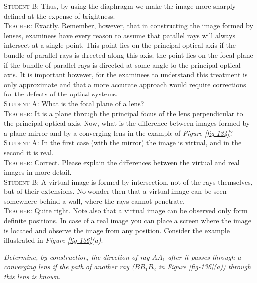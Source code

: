 \documentclass[a4paper,sfsidenotes]{tufte-book}
\begin{document}
\textsc{Student B:} Thus, by using the diaphragm we make the image more sharply defined at the expense of brightness.
\\
\textsc{Teacher:} Exactly. Remember, however, that in constructing the image formed by lenses, examinees have every reason to assume that parallel rays will always intersect at a single point. This point lies on the principal optical axis if the bundle of parallel rays is directed along this axis; the point lies on the focal plane if the bundle of parallel rays is directed at some angle to the principal optical axis. It is important however, for the examinees to understand this treatment is only approximate and that a more accurate approach would require corrections for the defects of the optical systems.
\\
\textsc{Student A:} What is the focal plane of a lens?
\\
\textsc{Teacher:} It is a plane through the principal focus of the lens perpendicular to the principal optical axis. Now, what is the difference between images formed by a plane mirror and by a converging lens in the example of \emph{Figure \ref{fig-134}}?
\\
\textsc{Student A:} In the first case (with the mirror) the image is virtual, and in the second it is real.
\\
\textsc{Teacher:} Correct. Please explain the differences between the virtual and real images in more detail.
\\
\textsc{Student B:} A virtual image is formed by intersection, not of the rays themselves, but of their extensions. No wonder then that a virtual image can be seen somewhere behind a wall, where the rays cannot penetrate.
\\
\textsc{Teacher:} Quite right. Note also that a virtual image can be observed only form definite positions. In case of a real image you can place a screen where the image is located and observe the image from any position. Consider the example illustrated in \emph{Figure \ref{fig-136}(a)}.

\emph{Determine, by construction, the direction of ray $AA_{1}$ after it passes through a converging lens if the path of another ray ($BB_{1}B_{2}$ in \emph{Figure \ref{fig-136}(a)}) through this lens is known.}
\end{document}
